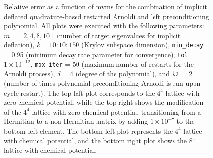 \begin{figure}[H]
    \caption{\small Relative error as a function of mvms for the combination of implicit deflated quadrature-based restarted Arnoldi and left preconditioning polynomial. All plots were executed with the following parameters: $m = [2, 4, 8, 10]$ (number of target eigenvalues for implicit deflation), $k = 10:10:150$ (Krylov subspace dimension), \texttt{min\_decay} = 0.95 (minimum decay rate parameter for convergence), \texttt{tol} = $1 \times 10^{-12}$, \texttt{max\_iter} = 50 (maximum number of restarts for the Arnoldi process), $d = 4$ (degree of the polynomial), and \texttt{k2} = 2 (number of times polynomial preconditioning Arnoldi is run upon cycle restart). The top left plot corresponds to the $4^4$ lattice with zero chemical potential, while the top right shows the modification of the $4^4$ lattice with zero chemical potential, transitioning from a Hermitian to a non-Hermitian matrix by adding $1 \times 10^{-7}$ to the bottom left element. The bottom left plot represents the $4^4$ lattice with chemical potential, and the bottom right plot shows the $8^4$ lattice with chemical potential.}
    \label{fig:combo_imp_rest_arnoldi+left_precond_mvms_plot}
\end{figure}

